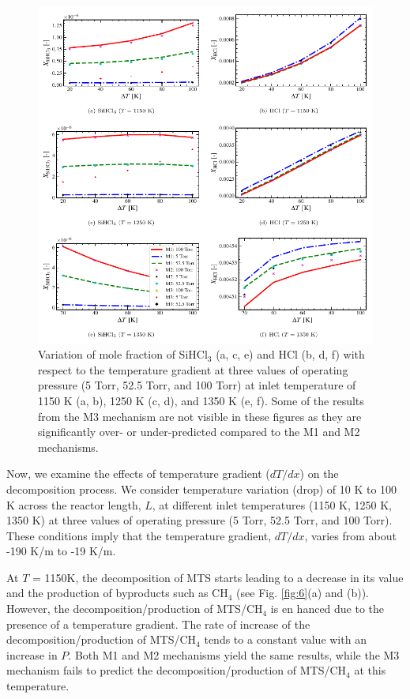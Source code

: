 \documentclass[final, letterpaper, square, comma, numbers, sort&compress]{elsarticle}
\begin{document}
\begin{figure}[p]
    \centering\includegraphics[width=\textwidth]{ph-fig9.png}
    \caption{Variation of mole fraction of SiHCl$_3$ (a, c, e) and HCl (b, d, f) with respect to the temperature gradient at three values of operating pressure (5 Torr, 52.5 Torr, and 100 Torr) at inlet temperature of 1150 K (a, b), 1250 K (c, d), and 1350 K (e, f). Some of the results from the M3 mechanism are not visible in these figures as they are significantly over- or under-predicted compared to the M1 and M2 mechanisms.}
    \label{fig:9}
\end{figure}
Now, we examine the effects of temperature gradient ($dT/dx$) on the decomposition process. We consider temperature variation (drop) of 10 K to 100 K across the reactor length, $L$, at different inlet temperatures (1150 K, 1250 K, 1350 K) at three values of operating pressure (5 Torr, 52.5 Torr, and 100 Torr). These conditions imply that the temperature gradient, $dT/dx$, varies from about -190 K/m to -19 K/m.

At $T$ = 1150K, the decomposition of MTS starts leading to a decrease in its value and the production of byproducts such as CH$_4$ (see Fig. \ref{fig:6}(a) and (b)). However, the decomposition/production of MTS/CH$_4$ is en hanced due to the presence of a temperature gradient. The rate of increase of the decomposition/production of MTS/CH$_4$ tends to a constant value with an increase in $P$. Both M1 and M2 mechanisms yield the same results, while the M3 mechanism fails to predict the decomposition/production of MTS/CH$_4$ at this temperature.
\end{document}
